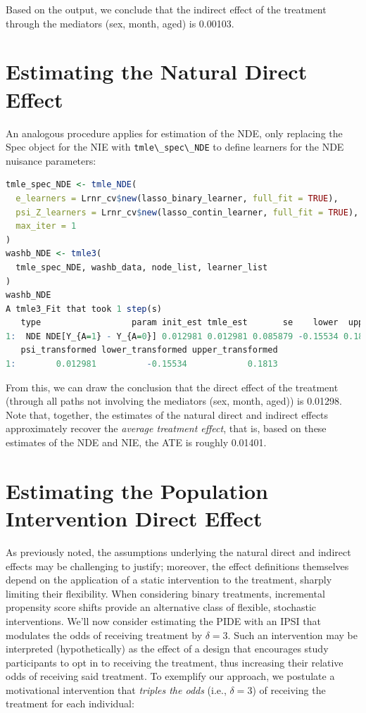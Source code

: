 \documentclass[12pt, krantz2,]{krantz}
\newcommand{\passthrough}[1]{#1}
\theoremstyle{definition}
\theoremstyle{definition}
\theoremstyle{definition}
\newcommand{\1}{\mathbbm{1}}
\begin{document}
Based on the output, we conclude that the indirect effect of the treatment
through the mediators (sex, month, aged) is
0.00103.

\hypertarget{estimating-the-natural-direct-effect}{%
\section{Estimating the Natural Direct Effect}\label{estimating-the-natural-direct-effect}}

An analogous procedure applies for estimation of the NDE, only replacing the
Spec object for the NIE with \passthrough{\lstinline!tmle\_spec\_NDE!} to define learners for the NDE
nuisance parameters:

\begin{lstlisting}[language=R]
tmle_spec_NDE <- tmle_NDE(
  e_learners = Lrnr_cv$new(lasso_binary_learner, full_fit = TRUE),
  psi_Z_learners = Lrnr_cv$new(lasso_contin_learner, full_fit = TRUE),
  max_iter = 1
)
washb_NDE <- tmle3(
  tmle_spec_NDE, washb_data, node_list, learner_list
)
washb_NDE
A tmle3_Fit that took 1 step(s)
   type                  param init_est tmle_est       se    lower  upper
1:  NDE NDE[Y_{A=1} - Y_{A=0}] 0.012981 0.012981 0.085879 -0.15534 0.1813
   psi_transformed lower_transformed upper_transformed
1:        0.012981          -0.15534            0.1813
\end{lstlisting}

From this, we can draw the conclusion that the direct effect of the treatment
(through all paths not involving the mediators (sex, month, aged)) is
0.01298. Note that, together, the estimates of
the natural direct and indirect effects approximately recover the \emph{average
treatment effect}, that is, based on these estimates of the NDE and NIE, the
ATE is roughly
0.01401.

\hypertarget{estimating-the-population-intervention-direct-effect}{%
\section{Estimating the Population Intervention Direct Effect}\label{estimating-the-population-intervention-direct-effect}}

As previously noted, the assumptions underlying the natural direct and indirect
effects may be challenging to justify; moreover, the effect definitions
themselves depend on the application of a static intervention to the treatment,
sharply limiting their flexibility. When considering binary treatments,
incremental propensity score shifts provide an alternative class of flexible,
stochastic interventions. We'll now consider estimating the PIDE with an IPSI
that modulates the odds of receiving treatment by \(\delta = 3\). Such an
intervention may be interpreted (hypothetically) as the effect of a design that
encourages study participants to opt in to receiving the treatment, thus
increasing their relative odds of receiving said treatment. To exemplify our
approach, we postulate a motivational intervention that \emph{triples the odds}
(i.e., \(\delta = 3\)) of receiving the treatment for each individual:
\end{document}
